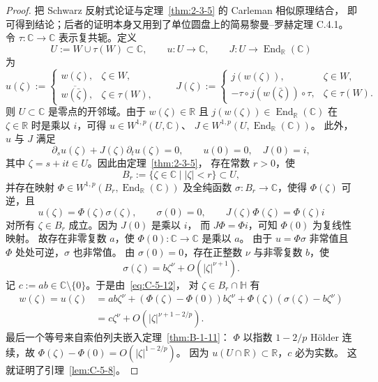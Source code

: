 \begin{proof}
把 Schwarz 反射式论证与定理~\ref{thm:2-3-5} 的 Carleman 相似原理结合，
即可得到结论；后者的证明本身又用到了单位圆盘上的简易黎曼--罗赫定理 C.4.1。
令 $\tau:\mathbb C\to\mathbb C$ 表示复共轭。定义
\[
  U:=W\cup\tau(W)\subset\mathbb C,\qquad
  u:U\to\mathbb C,\qquad
  J:U\to\operatorname{End}_{\mathbb R}(\mathbb C)
\]
为
\[
  u(\zeta):=
  \begin{cases}
    w(\zeta),&\zeta\in W,\\
    \overline{w(\bar\zeta)},&\zeta\in\tau(W),
  \end{cases}
  \qquad
  J(\zeta):=
  \begin{cases}
    j(w(\zeta)),&\zeta\in W,\\
    -\tau\circ j(w(\bar\zeta))\circ\tau,&\zeta\in\tau(W).
  \end{cases}
\]
则 $U\subset\mathbb C$ 是零点的开邻域。由于 $w(\zeta)\in\mathbb R$
且 $j(w(\zeta))\in\operatorname{End}_{\mathbb R}(\mathbb C)$
在 $\zeta\in\mathbb R$ 时是乘以 $i$，可得
$u\in W^{1,p}(U,\mathbb C)$、
$J\in W^{1,p}(U,\operatorname{End}_{\mathbb R}(\mathbb C))$。
此外，$u$ 与 $J$ 满足
\begin{equation}\label{eq:C-5-11}
  \partial_su(\zeta)+J(\zeta)\partial_tu(\zeta)=0,
  \qquad u(0)=0,\quad J(0)=i,
\end{equation}
其中 $\zeta=s+it\in U$。因此由定理~\ref{thm:2-3-5}，
存在常数 $r>0$，使
\[
  B_r:=\{\zeta\in\mathbb C\mid|\zeta|<r\}\subset U,
\]
并存在映射
$\Phi\in W^{1,p}(B_r,\operatorname{End}_{\mathbb R}(\mathbb C))$
及全纯函数 $\sigma:B_r\to\mathbb C$，使得 $\Phi(\zeta)$ 可逆，且
\begin{equation}\label{eq:C-5-12}
  u(\zeta)=\Phi(\zeta)\sigma(\zeta),\qquad
  \sigma(0)=0,\qquad J(\zeta)\Phi(\zeta)=\Phi(\zeta)i
\end{equation}
对所有 $\zeta\in B_r$ 成立。因为 $J(0)$ 是乘以 $i$，
而 $J\Phi=\Phi i$，可知 $\Phi(0)$ 为复线性映射。
故存在非零复数 $a$，使 $\Phi(0):\mathbb C\to\mathbb C$ 是乘以 $a$。
由于 $u=\Phi\sigma$ 非常值且 $\Phi$ 处处可逆，$\sigma$ 也非常值。
由 $\sigma(0)=0$，存在正整数 $\nu$ 与非零复数 $b$，使
\[
  \sigma(\zeta)=b\zeta^\nu+O(|\zeta|^{\nu+1}).
\]
记 $c:=ab\in\mathbb C\setminus\{0\}$。于是由~\eqref{eq:C-5-12}，
对 $\zeta\in B_r\cap\mathbb H$ 有
\begin{align*}
  w(\zeta)=u(\zeta)
   &=ab\zeta^\nu
      +(\Phi(\zeta)-\Phi(0))b\zeta^\nu
      +\Phi(\zeta)(\sigma(\zeta)-b\zeta^\nu)\\
   &=c\zeta^\nu+O(|\zeta|^{\nu+1-2/p}).
\end{align*}
最后一个等号来自索伯列夫嵌入定理~\ref{thm:B-1-11}：
$\Phi$ 以指数 $1-2/p$ Hölder 连续，故
$\Phi(\zeta)-\Phi(0)=O(|\zeta|^{1-2/p})$。
因为 $u(U\cap\mathbb R)\subset\mathbb R$，$c$ 必为实数。
这就证明了引理~\ref{lem:C-5-8}。
\end{proof}

